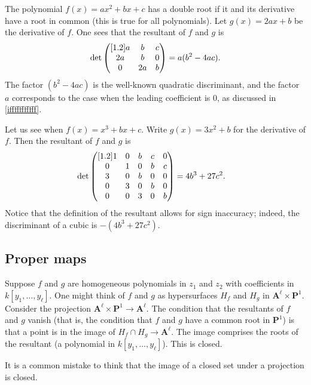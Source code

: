 \documentclass [11 pt, oneside, margin = 1 in] {article}
\begin{document}
\begin{example}[ ]\label{}\text{}
The polynomial $f(x)=ax^2+bx+c$ has a double root if it and its derivative have a root in common (this is true for all polynomials). Let $g(x)=2ax+b$ be the derivative of $f$. One sees that the resultant of $f$ and $g$ is
\begin{align*}
	\det\begin{pmatrix} [ 1.2 ] a&b&c\\2a&b&0\\0&2a&b\end{pmatrix} = a(b^2-4ac).
\end{align*}
The factor $(b^2-4ac)$ is the well-known quadratic discriminant, and the factor $a$ corresponds to the case when the leading coefficient is $0$, as discussed in \cref{ifffffffffff}.  
\end{example}

\begin{example}[ ]\label{}\text{}
Let us see when $f(x)=x^3+bx+c$. Write $g (x)= 3x^2 + b$ for the derivative of $f$. Then the resultant of $f$ and $g$ is
\begin{align*}
	\det\begin{pmatrix} [ 1.2 ] 1&0&b&c&0\\0&1&0&b&c\\3&0&b&0&0\\0&3&0&b&0\\0&0&3&0&b\end{pmatrix}&= 4b^3+27c^2.
\end{align*}
Notice that the definition of the resultant allows for sign inaccuracy; indeed, the discriminant of a cubic is $-(4b^3+27c^2)$.
\end{example}

\subsection{Proper maps}
Suppose $f$ and $g$ are homogeneous polynomials in $z_1$ and $z_2$ with coefficients in $k[y_1,\hdots, y_\ell]$. One might think of $f$ and $g$ as hypersurfaces $H_f$ and $H_g$ in $\mathbf{A}^\ell\times \mathbf{P}^1$. Consider the projection $\mathbf{A}^\ell\times \mathbf{P}^1\longrightarrow \mathbf{A}^\ell$. The condition that the resultants of $f$ and $g$ vanish (that is, the condition that $f$ and $g$ have a common root in $\mathbf{P}^1$) is that a point is in the image of $H_f\cap H_g\longrightarrow \mathbf{A}^\ell$. The image comprises the roots of the resultant (a polynomial in $k[y_1,\hdots,y_\ell]$). This is closed.

\begin{remark}
	It is a common mistake to think that the image of a closed set under a projection is closed.
\end{remark}
\end{document}
